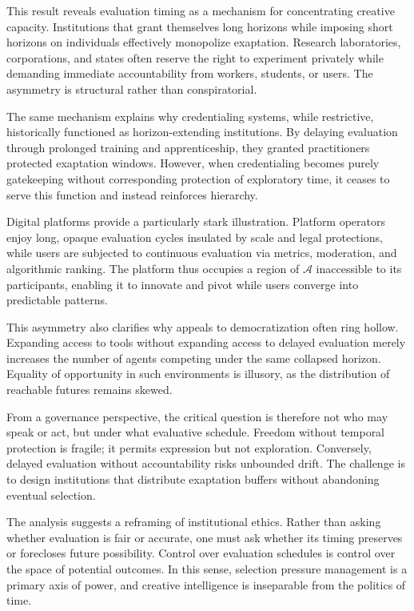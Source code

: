 \documentclass[11pt]{article}
\theoremstyle{definition}
\begin{document}
This result reveals evaluation timing as a mechanism for concentrating creative capacity. Institutions that grant themselves long horizons while imposing short horizons on individuals effectively monopolize exaptation. Research laboratories, corporations, and states often reserve the right to experiment privately while demanding immediate accountability from workers, students, or users. The asymmetry is structural rather than conspiratorial.

The same mechanism explains why credentialing systems, while restrictive, historically functioned as horizon-extending institutions. By delaying evaluation through prolonged training and apprenticeship, they granted practitioners protected exaptation windows. However, when credentialing becomes purely gatekeeping without corresponding protection of exploratory time, it ceases to serve this function and instead reinforces hierarchy.

Digital platforms provide a particularly stark illustration. Platform operators enjoy long, opaque evaluation cycles insulated by scale and legal protections, while users are subjected to continuous evaluation via metrics, moderation, and algorithmic ranking. The platform thus occupies a region of $\mathcal{A}$ inaccessible to its participants, enabling it to innovate and pivot while users converge into predictable patterns.

This asymmetry also clarifies why appeals to democratization often ring hollow. Expanding access to tools without expanding access to delayed evaluation merely increases the number of agents competing under the same collapsed horizon. Equality of opportunity in such environments is illusory, as the distribution of reachable futures remains skewed.

From a governance perspective, the critical question is therefore not who may speak or act, but under what evaluative schedule. Freedom without temporal protection is fragile; it permits expression but not exploration. Conversely, delayed evaluation without accountability risks unbounded drift. The challenge is to design institutions that distribute exaptation buffers without abandoning eventual selection.

The analysis suggests a reframing of institutional ethics. Rather than asking whether evaluation is fair or accurate, one must ask whether its timing preserves or forecloses future possibility. Control over evaluation schedules is control over the space of potential outcomes. In this sense, selection pressure management is a primary axis of power, and creative intelligence is inseparable from the politics of time.
\end{document}
